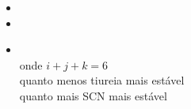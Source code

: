 \documentclass[12pt]{article}
\begin{document}
\vspace{2mm}

\begin{itemize}
	
	\item {}
	
	\item {}
	
	\item {}\\
		onde $i+j+k = 6$\\
		quanto menos tiureia mais estável\\
		quanto mais SCN mais estável
	
\end{itemize}

%	
%	 
%
%
%	
% 		
%		
%		
%		
%
\end{document}
